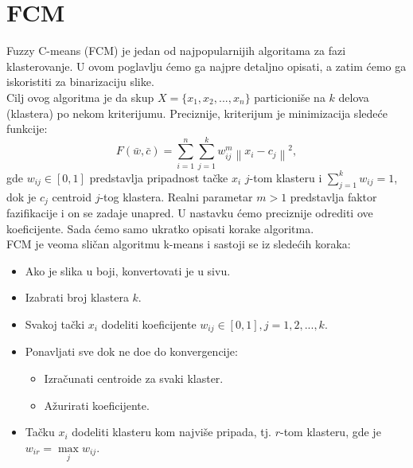 \documentclass[12pt,a4paper]{article}
\theoremstyle{definition}
\theoremstyle{remark}
\theoremstyle{plain}
\begin{document}
\section{FCM}
\label{sec:FCM}
Fuzzy C-means (FCM) je jedan od najpopularnijih algoritama za fazi klasterovanje. U ovom poglavlju \' cemo ga najpre detaljno opisati, a zatim \' cemo ga iskoristiti za binarizaciju slike.\\

Cilj ovog algoritma je da skup $X=\{x_{1}, x_{2}, ..., x_{n}\}$ particioni\v se na $k$ delova (klastera) po 
nekom kriterijumu. Preciznije, kriterijum je minimizacija slede\' ce funkcije:
\begin{equation*}
 F(\bar{w}, \bar{c}) = \sum_{i=1}^{n}\sum_{j=1}^{k}w_{ij}^{m}\left\|x_{i}-c_{j}\right\|^{2},
\end{equation*}
gde $w_{ij}\in [0, 1]$ predstavlja pripadnost ta\v cke $x_{i}$ $j$-tom klasteru i $\sum_{j=1}^{k}w_{ij}=1$, dok je $c_{j}$ centroid $j$-tog klastera. Realni parametar $m>1$ predstavlja faktor fazifikacije i on se zadaje unapred.
U nastavku \' cemo preciznije odrediti ove koeficijente. Sada \' cemo samo ukratko opisati korake algoritma.\\

FCM je veoma sli\v can algoritmu k-means i sastoji se iz slede\' cih koraka:
\begin{itemize}
  \item Ako je slika u boji, konvertovati je u sivu. 
  \item Izabrati broj klastera $k$.
  \item Svakoj ta\v cki $x_{i}$ dodeliti koeficijente $w_{ij} \in [0, 1], j=1,2,..., k$.
  \item Ponavljati sve dok ne do\dj e do konvergencije:
    \begin{itemize}
      \item Izra\v cunati centroide za svaki klaster.
      \item A\v zurirati koeficijente.
    \end{itemize}
  \item Ta\v cku $x_{i}$ dodeliti klasteru kom najvi\v se pripada, tj. $r$-tom klasteru, gde je $w_{ir}=\max\limits_{j} w_{ij}$.
\end{itemize}
\end{document}
